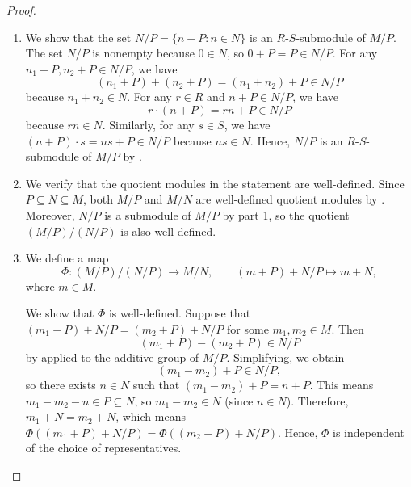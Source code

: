 \begin{proof}
    \begin{enumerate}
        \item We show that the set $N/P = \{ n + P : n \in N \}$ is an $R$-$S$-submodule of $M/P$. The set $N/P$ is nonempty because $0 \in N$, so $0 + P = P \in N/P$. For any $n_1 + P, n_2 + P \in N/P$, we have
        $$(n_1 + P) + (n_2 + P) = (n_1 + n_2) + P \in N/P$$
        because $n_1 + n_2 \in N$. For any $r \in R$ and $n + P \in N/P$, we have
        $$r \cdot (n + P) = r n + P \in N/P$$
        because $r n \in N$. Similarly, for any $s \in S$, we have $(n + P) \cdot s = n s + P \in N/P$ because $n s \in N$. Hence, $N/P$ is an $R$-$S$-submodule of $M/P$ by .

        \item We verify that the quotient modules in the statement are well-defined. Since $P \subseteq N \subseteq M$, both $M/P$ and $M/N$ are well-defined quotient modules by . Moreover, $N/P$ is a submodule of $M/P$ by part 1, so the quotient $(M/P)/(N/P)$ is also well-defined.

        \item We define a map
        $$\Phi : (M/P)/(N/P) \longrightarrow M/N, \qquad (m + P) + N/P \longmapsto m + N,$$
        where $m \in M$.

        We show that $\Phi$ is well-defined. Suppose that $(m_1 + P) + N/P = (m_2 + P) + N/P$ for some $m_1, m_2 \in M$. Then
        $$(m_1 + P) - (m_2 + P) \in N/P$$
        by  applied to the additive group of $M/P$. Simplifying, we obtain
        $$(m_1 - m_2) + P \in N/P,$$
        so there exists $n \in N$ such that $(m_1 - m_2) + P = n + P$. This means $m_1 - m_2 - n \in P \subseteq N$, so $m_1 - m_2 \in N$ (since $n \in N$). Therefore, $m_1 + N = m_2 + N$, which means $\Phi((m_1 + P) + N/P) = \Phi((m_2 + P) + N/P)$. Hence, $\Phi$ is independent of the choice of representatives.


\end{enumerate}
\end{proof}
